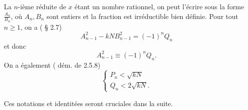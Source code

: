La $n$-ième réduite de $x$ étant un nombre rationnel, on peut l'écrire sous la
forme $\frac{A_n}{B_n}$, où $A_n, B_n$ sont entiers et la fraction est
irréductible bien définie. Pour tout $n\geqslant 1$, on a (\cite{Lauritzen} §
2.7) \[A_{n-1}^2 - kN B_{n-1}^2 = (-1)^n Q_n\] et donc
\begin{equation}
	A_{n-1}^2 \equiv (-1)^n Q_n.
\end{equation}
On a également (\cite{Lauritzen} dém. de 2.5.8)
\begin{equation}\label{inegalite}
	\begin{cases}
		P_n < \sqrt{kN} \\
		Q_n < 2\sqrt{kN}.
	\end{cases}
\end{equation}

Ces notations et identitées seront cruciales dans la suite.
